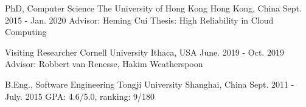 

\begin{cventries}


\cventry
{PhD, Computer Science} %
{The University of Hong Kong} %
{Hong Kong, China} %
{Sept. 2015 - Jan. 2020} %
{ %
Advisor: Heming Cui\newline
Thesis: High Reliability in Cloud Computing
}


\cventry
{Visiting Researcher} %
{Cornell University} %
{Ithaca, USA} %
{June. 2019 - Oct. 2019} %
{ %
Advisor: Robbert van Renesse, Hakim Weatherspoon
}


\cventry
{B.Eng., Software Engineering} %
{Tongji University} %
{Shanghai, China} %
{Sept. 2011 - July. 2015} %
{ %
GPA: 4.6/5.0, ranking: 9/180
}

\end{cventries}